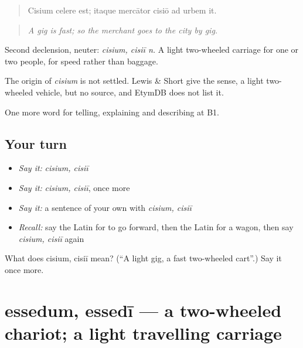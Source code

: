 \begin{quote}
Cisium celere est; itaque mercātor cisiō ad urbem it.
\end{quote}

\begin{quote}
\emph{A gig is fast; so the merchant goes to the city by gig.}
\end{quote}

Second declension, neuter: \emph{cisium, cisiī n.} A light two-wheeled carriage for one or two people, for speed rather than baggage.

\begin{cousinweb}
The origin of \emph{cisium} is not settled. Lewis \& Short give the sense, a light two-wheeled vehicle, but no source, and EtymDB does not list it.
\end{cousinweb}

\begin{grammarlens}[title={What you've built}]
One more word for telling, explaining and describing at B1.
\end{grammarlens}

\subsection*{Your turn}
\begin{itemize}
\raggedright
  \item \emph{Say it:} \emph{cisium, cisiī}
  \item \emph{Say it:} \emph{cisium, cisiī}, once more
  \item \emph{Say it:} a sentence of your own with \emph{cisium, cisiī}
  \item \emph{Recall:} say the Latin for to go forward, then the Latin for a wagon, then say \emph{cisium, cisiī} again
\end{itemize}

\begin{tcolorbox}[breakable,colback=teal!4,colframe=teal!35!black,title={Before you move on}]
What does cisium, cisiī mean? (\textquotedblleft{}A light gig, a fast two-wheeled cart\textquotedblright{}.) Say it once more.
\end{tcolorbox}
\section[essedum, essedī]{essedum, essedī — a two-wheeled chariot; a light travelling carriage}

\label{lesson:LA-C429-essedum}



